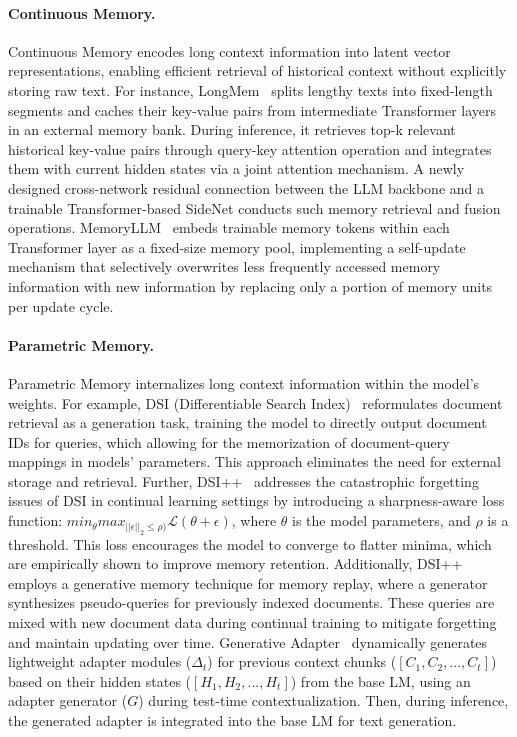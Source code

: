 \documentclass[11pt, a4paper, logo, copyright, nonumbering]{map}
\begin{document}
\paragraph{Continuous Memory.} 
Continuous Memory encodes long context information into latent vector representations, enabling efficient retrieval of historical context without explicitly storing raw text. 
For instance, 
LongMem~\citep{longmem} splits lengthy texts into fixed-length segments and caches their key-value pairs from intermediate Transformer layers in an external memory bank. During inference, it retrieves top-k relevant historical key-value pairs through query-key attention operation and integrates them with current hidden states via a joint attention mechanism. A newly designed cross-network residual connection between the LLM backbone and a trainable Transformer-based SideNet conducts such memory retrieval and fusion operations. 
MemoryLLM~\citep{memoryllm} embeds trainable memory tokens within each Transformer layer as a fixed-size memory pool, implementing a self-update mechanism that selectively overwrites less frequently accessed memory information with new information by replacing only a portion of memory units per update cycle. 

\paragraph{Parametric Memory.} 
Parametric Memory internalizes long context information within the model's weights. 
For example, 
DSI (Differentiable Search Index)~\citep{dsi} reformulates document retrieval as a generation task, training the model to directly output document IDs for queries, which allowing for the memorization of document-query mappings in models' parameters. This approach eliminates the need for external storage and retrieval. 
Further, DSI++~\citep{dsiplusplus} addresses the catastrophic forgetting issues of DSI in continual learning settings by introducing a sharpness-aware loss function: $min_{\theta}max_{||\epsilon||_2\le\rho)}\mathcal{L}(\theta+\epsilon)$, where $\theta$ is the model parameters, and $\rho$ is a threshold. This loss encourages the model to converge to flatter minima, which are empirically shown to improve memory retention. Additionally, DSI++ employs a generative memory technique for memory replay, where a generator synthesizes pseudo-queries for previously indexed documents. These queries are mixed with new document data during continual training to mitigate forgetting and maintain updating over time. 
Generative Adapter~\citep{chen2024generative} dynamically generates lightweight adapter modules (\(\Delta_t\)) for previous context chunks (\([C_1, C_2, ..., C_t]\)) based on their hidden states (\([H_1, H_2, ..., H_t]\)) from the base LM, using an adapter generator (\(G\)) during test-time contextualization. Then, during inference, the generated adapter is integrated into the base LM for text generation.
\end{document}

